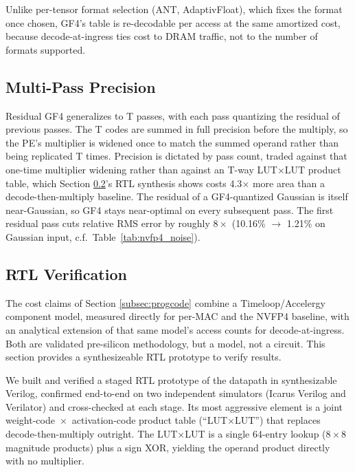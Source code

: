 Unlike per-tensor format selection (ANT, AdaptivFloat), which fixes the format
once chosen, GF4's table is re-decodable per access at the same amortized cost,
because decode-at-ingress ties cost to DRAM traffic, not to the number of formats
supported.


\subsection{Multi-Pass Precision}\label{subsec:multipass}

Residual GF4 generalizes to T passes, with each pass quantizing the residual of
previous passes. The T codes are summed in full precision before the multiply, so
the PE's multiplier is widened once to match the summed operand rather than being
replicated T times. Precision is dictated by pass count, traded against that
one-time multiplier widening rather than against an T-way LUT$\times$LUT product
table, which Section \ref{sub:rtl}'s RTL synthesis shows costs 4.3$\times$ more
area than a decode-then-multiply baseline. The residual of a GF4-quantized
Gaussian is itself near-Gaussian, so GF4 stays near-optimal on every subsequent
pass. The first residual pass cuts relative RMS error by roughly $8\times$
(10.16\% $\rightarrow$ 1.21\% on Gaussian input, c.f.\ Table~\ref{tab:nvfp4_noise}).


\subsection{RTL Verification}\label{sub:rtl}

The cost claims of Section \ref{subsec:progcode} combine a Timeloop/Accelergy
component model, measured directly for per-MAC and the NVFP4 baseline, with an
analytical extension of that same model's access counts for decode-at-ingress.
Both are validated pre-silicon methodology, but a model, not a circuit. This
section provides a synthesizeable RTL prototype to verify results.

We built and verified a staged RTL prototype of the datapath in synthesizable
Verilog, confirmed end-to-end on two independent simulators (Icarus Verilog and
Verilator) and cross-checked at each stage. Its most aggressive element is a
joint weight-code~$\times$~activation-code product table (``LUT$\times$LUT'') that
replaces decode-then-multiply outright. The LUT$\times$LUT is a single 64-entry
lookup ($8\times8$ magnitude products) plus a sign XOR, yielding the operand
product directly with no multiplier.


